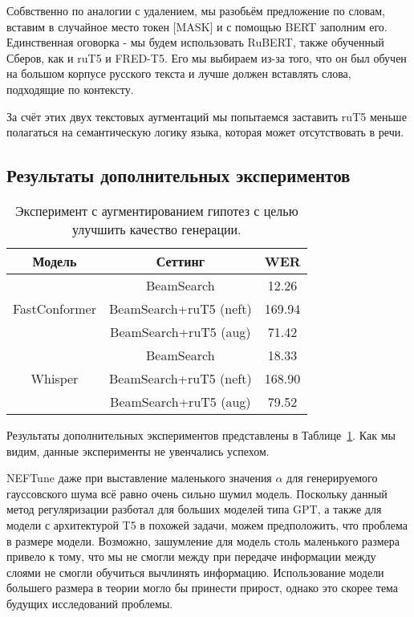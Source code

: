 Собвственно по аналогии с удалением, мы разобьём предложение по словам, вставим в случайное место токен [MASK] и с помощью BERT заполним его.
Единственная оговорка - мы будем использовать RuBERT, также обученный Сберов, как и ruT5 и FRED-T5.
Его мы выбираем из-за того, что он был обучен на большом корпусе русского текста и лучше должен вставлять слова, подходящие по контексту.

За счёт этих двух текстовых аугментаций мы попытаемся заставить ruT5 меньше полагаться на семантическую логику языка, которая может отсутствовать в речи.

\subsection{Результаты дополнительных экспериментов}

\begin{table}[]
\centering
\caption{Эксперимент с аугментированием гипотез с целью улучшить качество генерации.}
\begin{tabular}{|c|c|c|}
\hline
Модель                         & Сеттинг                              & WER     \\ \hline
\multirow{3}{*}{FastConformer} & BeamSearch                           & 12.26   \\ \cline{2-3} 
                               & BeamSearch+ruT5 (neft)               & 169.94  \\ \cline{2-3} 
                               & BeamSearch+ruT5 (aug)                & 71.42   \\ \hline
\multirow{3}{*}{Whisper}       & BeamSearch                           & 18.33   \\ \cline{2-3} 
                               & BeamSearch+ruT5 (neft)               & 168.90  \\ \cline{2-3} 
                               & BeamSearch+ruT5 (aug)                & 79.52   \\ \hline
\end{tabular}
\label{tab:fails}
\end{table}

Результаты дополнительных экспериментов представлены в Таблице~\ref{tab:fails}.
Как мы видим, данные эксперименты не увенчались успехом.

NEFTune даже при выставление маленького значения $\alpha$ для генерируемого гауссовского шума всё равно очень сильно шумил модель.
Поскольку данный метод регуляризации разботал для больших моделей типа GPT, а также для модели с архитектурой T5 в похожей задачи, можем предположить, что проблема в размере модели.
Возможно, зашумление для модель столь маленького размера привело к тому, что мы не смогли между при передаче информации между слоями не смогли обучиться вычлинять информацию.
Использование модели большего размера в теории могло бы принести прирост, однако это скорее тема будущих исследований проблемы.

